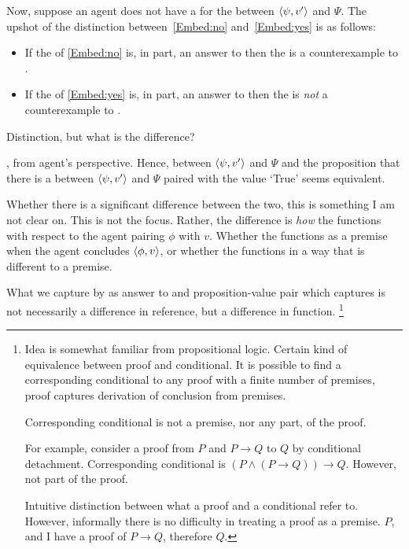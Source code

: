 \begin{note}
  Now, suppose an agent does not have a  for the \ros{} between \(\langle \psi, v' \rangle\) and \(\Psi\).
  The upshot of the distinction between~\ref{Embed:no} and~\ref{Embed:yes} is as follows:

  \begin{itemize}
  \item
    If the  of \ref{Embed:no} is, in part, an answer to \qWhyV{} then the  is a counterexample to \issueConstraint{}.
  \item
    If the  of \ref{Embed:yes} is, in part, an answer to \qWhyV{} then the  is \emph{not} a counterexample to \issueConstraint{}.
  \end{itemize}

  Distinction, but what is the difference?

  \ros{}, from agent's perspective.
  Hence, \ros{} between \(\langle \psi, v' \rangle\) and \(\Psi\) and the proposition that there is a \ros{} between \(\langle \psi, v' \rangle\) and \(\Psi\) paired with the value `True' seems equivalent.

  Whether there is a significant difference between the two, this is something I am not clear on.
  This is not the focus.
  Rather, the difference is \emph{how} the \ros{} functions with respect to the agent pairing \(\phi\) with \(v\).
  Whether the \ros{} functions as a premise when the agent concludes \(\langle \phi, v \rangle\), or whether the \ros{} functions in a way that is different to a premise.

  What we capture by \ros{} as answer to \qWhyV{} and proposition-value pair which captures \ros{} is not necessarily a difference in reference, but a difference in function.%
  \footnote{
    Idea is somewhat familiar from propositional logic.
    Certain kind of equivalence between proof and conditional.
    It is possible to find a corresponding conditional to any proof with a finite number of premises, proof captures derivation of conclusion from premises.

    Corresponding conditional is not a premise, nor any part, of the proof.

    For example, consider a proof from \(P\) and \(P \rightarrow Q\) to \(Q\) by conditional detachment.
    Corresponding conditional is \((P \land (P \rightarrow Q)) \rightarrow Q\).
    However, not part of the proof.

    Intuitive distinction between what a proof and a conditional refer to.
    However, informally there is no difficulty in treating a proof as a premise.
    \(P\), and I have a proof of \(P \rightarrow Q\), therefore \(Q\).
  }
\end{note}

